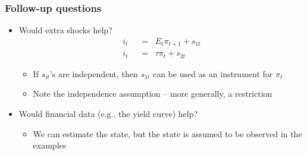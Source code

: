 \documentclass[handout]{beamer}
\begin{document}
\begin{frame}
\frametitle{Follow-up questions}

\begin{itemize} \itemsep=\bigskipamount
\item Would extra shocks help?
   \begin{align*}
    i_t &\;\;=\;\; E_t \pi_{t+1} +s_{1t} \\
    i_t &\;\;=\;\;  \tau \pi_{t} + s_{2t}
\end{align*}
\begin{itemize}
      \item If $s_{it}$'s are independent, then $s_{1t}$ can be used as an instrument for $\pi_t$
      \item Note the independence assumption -- more generally, a restriction
\end{itemize}
\item Would financial data (e.g., the yield curve) help?
\begin{itemize}
      \item We can estimate the state, but the state is assumed to be observed in the examples
\end{itemize}
\end{itemize}

\end{frame}
\end{document}
